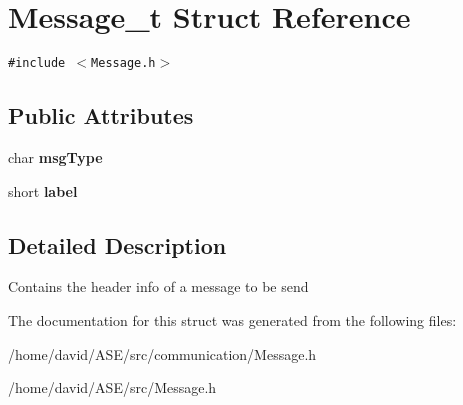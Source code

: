 \hypertarget{structMessage__t}{
\section{Message\_\-t Struct Reference}
\label{structMessage__t}
}
{\tt \#include $<$Message.h$>$}

\subsection*{Public Attributes}
\begin{CompactItemize}
\item 
\hypertarget{structMessage__t_a7a7b1d2a1c2499f36e7e27618367ab0}{
char \textbf{msgType}}
\label{structMessage__t_a7a7b1d2a1c2499f36e7e27618367ab0}

\item 
\hypertarget{structMessage__t_2417a9b6f24a2244a60aceaa4168a22a}{
short \textbf{label}}
\label{structMessage__t_2417a9b6f24a2244a60aceaa4168a22a}

\end{CompactItemize}


\subsection{Detailed Description}
Contains the header info of a message to be send 

The documentation for this struct was generated from the following files:\begin{CompactItemize}
\item 
/home/david/ASE/src/communication/Message.h\item 
/home/david/ASE/src/Message.h\end{CompactItemize}
